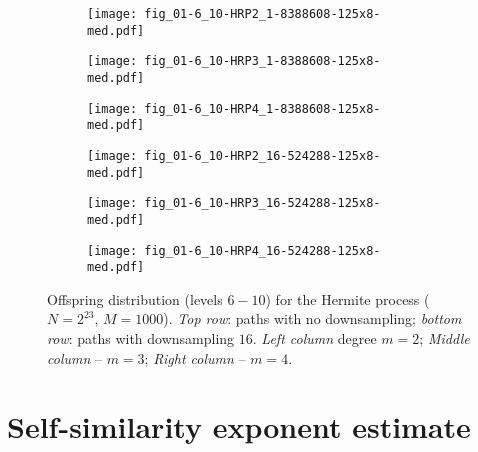 \documentclass[a4paper]{extarticle}
\begin{document}
\begin{figure}[ht]
  \centering
  \begin{subfigure}[b]{0.3\textwidth}
    \texttt{[image: fig\_01-6\_10-HRP2\_1-8388608-125x8-med.pdf]}
  \end{subfigure}\hspace{-2.em}
  \begin{subfigure}[b]{0.3\textwidth}
    \texttt{[image: fig\_01-6\_10-HRP3\_1-8388608-125x8-med.pdf]}
  \end{subfigure}\hspace{-2.em}
  \begin{subfigure}[b]{0.3\textwidth}
    \texttt{[image: fig\_01-6\_10-HRP4\_1-8388608-125x8-med.pdf]}
  \end{subfigure}\vspace{-1.0em}

  \begin{subfigure}[b]{0.3\textwidth}
    \texttt{[image: fig\_01-6\_10-HRP2\_16-524288-125x8-med.pdf]}
  \end{subfigure}\hspace{-2.em}
  \begin{subfigure}[b]{0.3\textwidth}
    \texttt{[image: fig\_01-6\_10-HRP3\_16-524288-125x8-med.pdf]}
  \end{subfigure}\hspace{-2.em}
  \begin{subfigure}[b]{0.3\textwidth}
    \texttt{[image: fig\_01-6\_10-HRP4\_16-524288-125x8-med.pdf]}
  \end{subfigure}\vspace{-.5em}

  \caption{Offspring distribution (levels $6-10$) for the Hermite process ($N = 2^{23}$, $M=1000$).
  \emph{Top row}: paths with no downsampling; \emph{bottom row}: paths with downsampling $16$.
  \emph{Left column} degree $m=2$; \emph{Middle column} -- $m=3$; \emph{Right column} -- $m=4$.}
  \label{fig:hrp_offspring}
\end{figure}

\clearpage


\section{Self-similarity exponent estimate} %
\label{sec:self_similarity_exponent_estimate}
\end{document}
